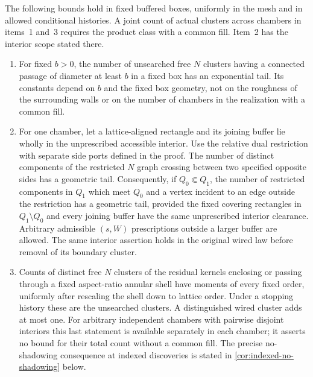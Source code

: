 \begin{proposition}
\label{prop:cluster-counts}
The following bounds hold in fixed buffered boxes, uniformly in the
mesh and in allowed conditional histories. A joint count of actual
clusters across chambers in items~1 and~3 requires the product class
with a common fill. Item~2 has the interior scope stated there.
\begin{enumerate}
\item For fixed $b>0$, the number of unsearched free $N$ clusters
having a connected passage of diameter at least $b$ in a fixed box
has an exponential tail. Its constants depend on $b$ and the fixed
box geometry, not on the roughness of the surrounding walls or on
the number of chambers in the realization with a common fill.
\item For one chamber, let a lattice-aligned rectangle and its joining buffer lie
wholly in the unprescribed accessible interior. Use the relative dual
restriction with separate side ports defined in the proof. The number of distinct
components of the restricted $N$ graph crossing between two specified
opposite sides has a geometric tail. Consequently, if
$Q_0\Subset Q_1$, the number of restricted components in $Q_1$
which meet $Q_0$ and a vertex incident to an edge outside the
restriction has a geometric tail, provided the fixed covering
rectangles in $Q_1\setminus Q_0$ and every joining buffer have the
same unprescribed interior clearance. Arbitrary admissible $(s,W)$
prescriptions outside a larger buffer are allowed. The same interior
assertion holds in the original wired law before removal of its
boundary cluster.
\item Counts of distinct free $N$ clusters of the residual kernels
enclosing or passing through a fixed
aspect-ratio annular shell have moments of every fixed order, uniformly
after rescaling the shell down to lattice order. Under a stopping
history these are the unsearched clusters. A distinguished wired
cluster adds at most one. For arbitrary
independent chambers with pairwise disjoint interiors this last
statement is available separately in each chamber; it asserts no
bound for their total count without a common fill. The precise
no-shadowing consequence at indexed discoveries is stated in
\cref{cor:indexed-no-shadowing} below.
\end{enumerate}
\end{proposition}

